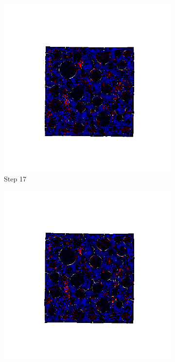 \begin{figure}[ht!]
      \begin{subfigure}{.25\textwidth}
        \centering
        \includegraphics[width=1.0\linewidth]{Files//A30P75_3_IS/DEP50-STEP(017).png}
      \caption{Step 17}
      \end{subfigure}%
      \begin{subfigure}{.25\textwidth}
        \centering
        \includegraphics[width=1.0\linewidth]{Files/A30P75_3_IS/DEP50-STEP(018).png}

\end{subfigure}
\end{figure}
